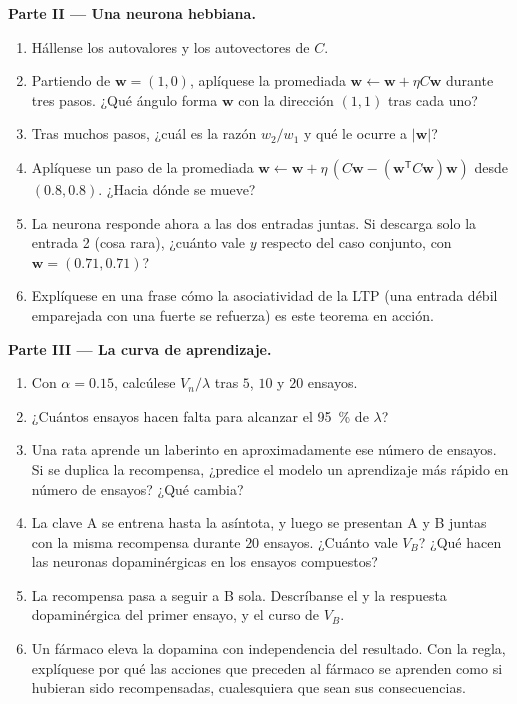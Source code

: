 \begin{problem}
\medskip
\noindent\textbf{Parte II --- Una neurona hebbiana.}
\begin{enumerate}[resume]
  \item Hállense los autovalores y los autovectores de $C$.
  \item Partiendo de $\mathbf{w} = (1, 0)$, aplíquese la 
        promediada $\mathbf{w} \leftarrow \mathbf{w} + \eta C\mathbf{w}$
        durante tres pasos. ¿Qué ángulo forma $\mathbf{w}$ con la
        dirección $(1,1)$ tras cada uno?
  \item Tras muchos pasos, ¿cuál es la razón $w_{2}/w_{1}$ y qué le
        ocurre a $|\mathbf{w}|$?
  \item Aplíquese un paso de la  promediada $\mathbf{w} \leftarrow \mathbf{w} +
        \eta\,(C\mathbf{w} - (\mathbf{w}^{\mathsf{T}}C\mathbf{w})
        \mathbf{w})$ desde $(0.8, 0.8)$. ¿Hacia dónde se mueve?
  \item La neurona responde ahora a las dos entradas juntas. Si
        descarga solo la entrada 2 (cosa rara), ¿cuánto vale $y$
        respecto del caso conjunto, con $\mathbf{w} = (0.71, 0.71)$?
  \item Explíquese en una frase cómo la asociatividad de la LTP (una
        entrada débil emparejada con una fuerte se refuerza) es este
        teorema en acción.
\end{enumerate}

\medskip
\noindent\textbf{Parte III --- La curva de aprendizaje.}
\begin{enumerate}[resume]
  \item Con $\alpha = 0.15$, calcúlese $V_{n}/\lambda$ tras $5$, $10$ y
        $20$ ensayos.
  \item ¿Cuántos ensayos hacen falta para alcanzar el \qty{95}{\%} de
        $\lambda$?
  \item Una rata aprende un laberinto en aproximadamente ese número de
        ensayos. Si se duplica la recompensa, ¿predice el modelo un
        aprendizaje más rápido en número de ensayos? ¿Qué cambia?
  \item La clave A se entrena hasta la asíntota, y luego se presentan A
        y B juntas con la misma recompensa durante $20$ ensayos.
        ¿Cuánto vale $V_{B}$? ¿Qué hacen las neuronas dopaminérgicas en
        los ensayos compuestos?
  \item La recompensa pasa a seguir a B sola. Descríbanse el  y la respuesta dopaminérgica del primer ensayo, y el
        curso de $V_{B}$.
  \item Un fármaco eleva la dopamina con independencia del resultado.
        Con la regla, explíquese por qué las acciones que preceden al
        fármaco se aprenden como si hubieran sido recompensadas,
        cualesquiera que sean sus consecuencias.
\end{enumerate}


\end{problem}
